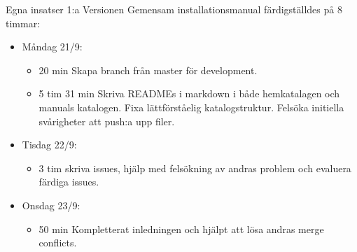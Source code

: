 \documentclass{TDP003mall}
\begin{document}
Egna insatser 1:a Versionen Gemensam installationsmanual färdigställdes på 8 timmar:
\begin{itemize}
  \item Måndag 21/9:
  \begin{itemize}
    \item 20 min Skapa branch från master för development.
    \item 5  tim 31 min Skriva READMEs i markdown i både hemkatalagen och manuals katalogen. Fixa lättförståelig katalogstruktur. Felsöka initiella svårigheter att push:a upp filer.
  \end{itemize}
  \item Tisdag 22/9:
  \begin{itemize}
                \item 3 tim skriva issues, hjälp med felsökning av andras problem och evaluera färdiga issues.
        \end{itemize}
        \item Onsdag 23/9:
        \begin{itemize}
                \item 50 min Kompletterat inledningen och hjälpt att lösa andras merge conflicts.\\
  \end{itemize}
\end{itemize}
\end{document}
